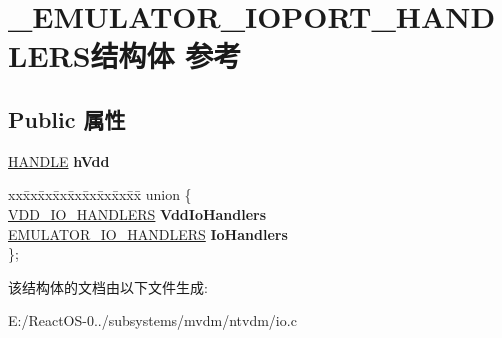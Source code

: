 \hypertarget{struct___e_m_u_l_a_t_o_r___i_o_p_o_r_t___h_a_n_d_l_e_r_s}{}\section{\+\_\+\+E\+M\+U\+L\+A\+T\+O\+R\+\_\+\+I\+O\+P\+O\+R\+T\+\_\+\+H\+A\+N\+D\+L\+E\+R\+S结构体 参考}
\label{struct___e_m_u_l_a_t_o_r___i_o_p_o_r_t___h_a_n_d_l_e_r_s}
\subsection*{Public 属性}
\begin{DoxyCompactItemize}
\item 
\mbox{\label{struct___e_m_u_l_a_t_o_r___i_o_p_o_r_t___h_a_n_d_l_e_r_s_a0671516b289a9f195c890f3ca869f9f0}} 
\hyperlink{interfacevoid}{H\+A\+N\+D\+LE} {\bfseries h\+Vdd}
\item 
\mbox{\label{struct___e_m_u_l_a_t_o_r___i_o_p_o_r_t___h_a_n_d_l_e_r_s_a0e63763787b04ea94765c0c132761e5a}} 
\begin{tabbing}
xx\=xx\=xx\=xx\=xx\=xx\=xx\=xx\=xx\=\kill
union \{\\
\>\hyperlink{struct___v_d_d___i_o___h_a_n_d_l_e_r_s}{VDD\_IO\_HANDLERS} {\bfseries VddIoHandlers}\\
\>\hyperlink{struct___e_m_u_l_a_t_o_r___i_o___h_a_n_d_l_e_r_s}{EMULATOR\_IO\_HANDLERS} {\bfseries IoHandlers}\\
\}; \\

\end{tabbing}\end{DoxyCompactItemize}


该结构体的文档由以下文件生成\+:\begin{DoxyCompactItemize}
\item 
E\+:/\+React\+O\+S-\/0../subsystems/mvdm/ntvdm/io.\+c\end{DoxyCompactItemize}
